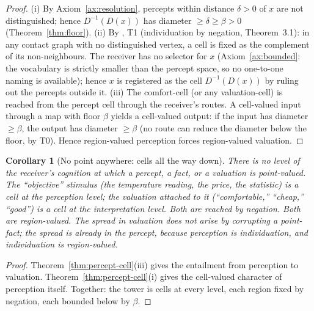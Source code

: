\documentclass[twocolumn,11pt,a4paper]{article}
\theoremstyle{adv}
\newtheorem{corollary}[theorem]{Corollary}
\theoremstyle{definition}
\theoremstyle{remark}
\newcommand{\Dec}{D}                   %
\newcommand{\floor}{\beta}            %
\begin{document}
\begin{proof}
(i) By Axiom~\ref{ax:resolution}, percepts within distance $\delta>0$
of $x$ are not distinguished; hence $\Dec^{-1}(\Dec(x))$ has diameter
$\ge\delta\ge\floor>0$ (Theorem~\ref{thm:floor}). (ii) By
\citet{sachikonye2025contact}, T1 (individuation by negation,
Theorem~3.1): in any contact graph with no distinguished vertex, a cell is
fixed as the complement of its non-neighbours. The receiver has no selector
for $x$ (Axiom~\ref{ax:bounded}: the vocabulary is strictly smaller than the
percept space, so no one-to-one naming is available); hence $x$ is registered
as the cell $\Dec^{-1}(\Dec(x))$ by ruling out the percepts outside it.
(iii) The comfort-cell (or any valuation-cell) is reached from the percept
cell through the receiver's routes. A cell-valued input through a map with
floor $\floor$ yields a cell-valued output: if the input has diameter
$\ge\floor$, the output has diameter $\ge\floor$ (no route can reduce the
diameter below the floor, by T0). Hence region-valued perception forces
region-valued valuation.
\end{proof}

\begin{corollary}[No point anywhere: cells all the way down]
\label{cor:cellsdown}
There is no level of the receiver's cognition at which a percept, a fact, or
a valuation is point-valued. The ``objective'' stimulus (the temperature
reading, the price, the statistic) is a cell at the perception level; the
valuation attached to it (``comfortable,'' ``cheap,'' ``good'') is a cell at
the interpretation level. Both are reached by negation. Both are
region-valued. The spread in valuation does not arise by corrupting a
point-fact; the spread is already in the percept, because perception is
individuation, and individuation is region-valued.
\end{corollary}

\begin{proof}
Theorem~\ref{thm:percept-cell}(iii) gives the entailment from perception to
valuation. Theorem~\ref{thm:percept-cell}(i) gives the cell-valued character
of perception itself. Together: the tower is cells at every level, each
region fixed by negation, each bounded below by $\floor$.
\end{proof}
\end{document}
